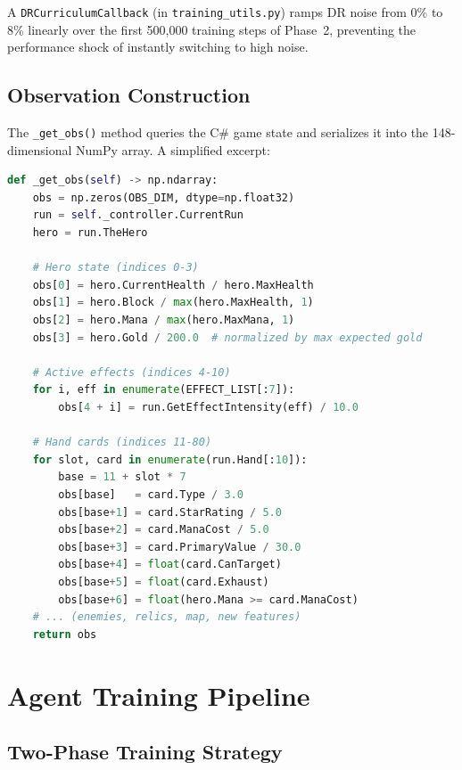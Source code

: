 A \texttt{DRCurriculumCallback} (in \texttt{training\_utils.py}) ramps DR noise from 0\% to 8\% linearly over the first 500,000 training steps of Phase~2, preventing the performance shock of instantly switching to high noise.

\subsection{Observation Construction}

The \texttt{\_get\_obs()} method queries the C\# game state and serializes it into the 148-dimensional NumPy array. A simplified excerpt:

\begin{lstlisting}[language=Python, caption={Observation vector construction}]
def _get_obs(self) -> np.ndarray:
    obs = np.zeros(OBS_DIM, dtype=np.float32)
    run = self._controller.CurrentRun
    hero = run.TheHero

    # Hero state (indices 0-3)
    obs[0] = hero.CurrentHealth / hero.MaxHealth
    obs[1] = hero.Block / max(hero.MaxHealth, 1)
    obs[2] = hero.Mana / max(hero.MaxMana, 1)
    obs[3] = hero.Gold / 200.0  # normalized by max expected gold

    # Active effects (indices 4-10)
    for i, eff in enumerate(EFFECT_LIST[:7]):
        obs[4 + i] = run.GetEffectIntensity(eff) / 10.0

    # Hand cards (indices 11-80)
    for slot, card in enumerate(run.Hand[:10]):
        base = 11 + slot * 7
        obs[base]   = card.Type / 3.0
        obs[base+1] = card.StarRating / 5.0
        obs[base+2] = card.ManaCost / 5.0
        obs[base+3] = card.PrimaryValue / 30.0
        obs[base+4] = float(card.CanTarget)
        obs[base+5] = float(card.Exhaust)
        obs[base+6] = float(hero.Mana >= card.ManaCost)
    # ... (enemies, relics, map, new features)
    return obs
\end{lstlisting}

\section{Agent Training Pipeline}

\subsection{Two-Phase Training Strategy}

